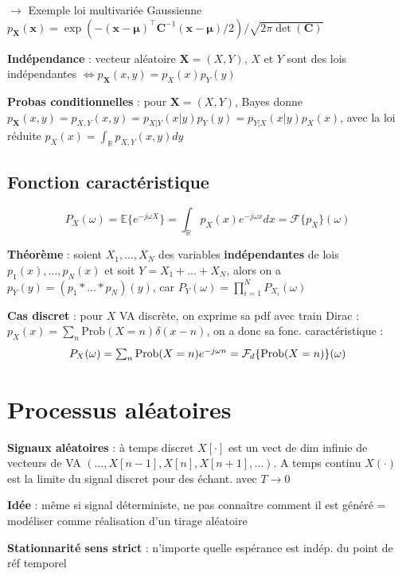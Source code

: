 \quad $\rightarrow$ Exemple loi multivariée Gaussienne $p_\mathbf{X}(\mathbf{x}) = \exp(-(\mathbf{x-\mu})^\intercal \mathbf{C}^{-1} (\mathbf{x}-\mathbf{\mu})/2)/\sqrt{2\pi \det(\mathbf{C})}$

\textbf{Indépendance} : vecteur aléatoire $\mathbf{X}=(X,Y)$, $X$ et $Y$ sont des lois indépendantes $\Leftrightarrow p_\mathbf{X}(x,y) = p_X(x)p_Y(y)$

\textbf{Probas conditionnelles} : pour $\mathbf{X} = (X,Y)$, Bayes donne $p_\mathbf{X}(x,y) = p_{X,Y}(x,y) = p_{X|Y}(x|y) p_Y(y) = p_{Y|X}(x|y) p_X(x)$, avec la loi réduite $p_X(x)=\int_\mathbb{R}p_{X,Y}(x,y)dy$

\subsection*{Fonction caractéristique}
\begin{equation*}
    P_X(\omega) = \mathbb{E}\{e^{-j\omega X}\} = \int_\mathbb{R} p_X(x) e^{-j\omega x} dx = \mathcal{F}\{p_X\}(\omega)
\end{equation*}

\textbf{Théorème} : soient $X_1,\dots,X_N$ des variables \textbf{indépendantes} de lois $p_1(x), \dots, p_N(x)$ et soit $Y=X_1+\dots+X_N$, alors on a $p_Y(y) = (p_1 * \dots * p_N)(y)$, car $P_Y(\omega) = \prod_{i=1}^N P_{X_i}(\omega)$

\textbf{Cas discret} : pour $X$ VA discrète, on exprime sa pdf avec train Dirac : $p_X(x) = \sum_n \text{Prob}(X=n)\delta(x-n)$, on a donc sa fonc. caractéristique : \[P_X(\omega) = \textstyle\sum_n \text{Prob}(X=n) e^{-j\omega n} = \mathcal{F}_d\{\text{Prob}(X=n)\}(\omega)\]


\section{Processus aléatoires}

\textbf{Signaux aléatoires} : à temps discret $X[\cdot]$ est un vect de dim infinie de vecteurs de VA $(\dots, X[n-1], X[n], X[n+1], \dots)$. A temps continu $X(\cdot)$ est la limite du signal discret pour des échant. avec $T\rightarrow 0$ 

\textbf{Idée} : même si signal déterministe, ne pas connaître comment il est généré = modéliser comme réalisation d'un tirage aléatoire

\textbf{Stationnarité sens strict} : n'importe quelle espérance est indép. du point de réf temporel

